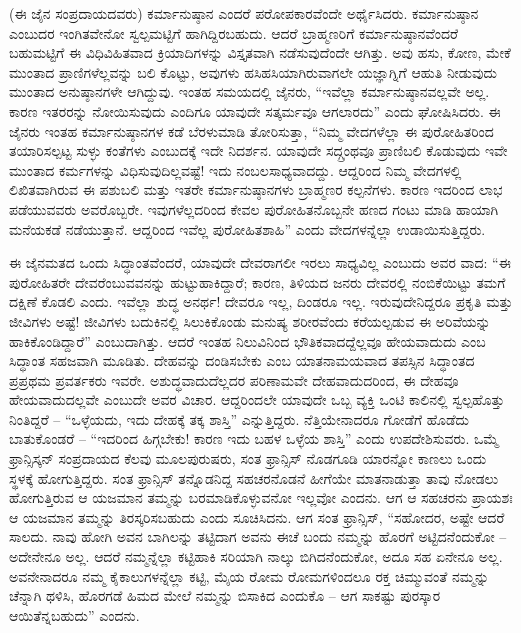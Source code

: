 (ಈ ಜೈನ ಸಂಪ್ರದಾಯದವರು) ಕರ್ಮಾನುಷ್ಠಾನ ಎಂದರೆ ಪರೋಪಕಾರವೆಂದೇ ಅರ್ಥೈಸಿದರು. ಕರ್ಮಾನುಷ್ಠಾನ ಎಂಬುದರ ಇಂಗಿತವೇನೋ ಸ್ವಲ್ಪಮಟ್ಟಿಗೆ ಹಾಗಿದ್ದಿರಬಹುದು. ಆದರೆ ಬ್ರಾಹ್ಮಣರಿಗೆ ಕರ್ಮಾನುಷ್ಠಾನವೆಂದರೆ ಬಹುಮಟ್ಟಿಗೆ ಈ ವಿಧಿವಿಹಿತವಾದ ಕ್ರಿಯಾದಿಗಳನ್ನು ವಿಸ್ತೃತವಾಗಿ ನಡೆಸುವುದೆಂದೇ ಆಗಿತ್ತು. ಅವು ಹಸು, ಕೋಣ, ಮೇಕೆ ಮುಂತಾದ ಪ್ರಾಣಿಗಳೆಲ್ಲವನ್ನು ಬಲಿ ಕೊಟ್ಟು, ಅವುಗಳು ಹಸಿಹಸಿಯಾಗಿರುವಾಗಲೇ ಯಜ್ಞಾಗ್ನಿಗೆ ಆಹುತಿ ನೀಡುವುದು ಮುಂತಾದ ಅನುಷ್ಠಾನಗಳೇ ಆಗಿದ್ದುವು. ಇಂತಹ ಸಮಯದಲ್ಲಿ ಜೈನರು, “ಇವೆಲ್ಲಾ ಕರ್ಮಾನುಷ್ಠಾನವಲ್ಲವೇ ಅಲ್ಲ. ಕಾರಣ ಇತರರನ್ನು ನೋಯಿಸುವುದು ಎಂದಿಗೂ ಯಾವುದೇ ಸತ್ಕರ್ಮವೂ ಆಗಲಾರದು” ಎಂದು ಘೋಷಿಸಿದರು. ಈ ಜೈನರು ಇಂತಹ ಕರ್ಮಾನುಷ್ಠಾನಗಳ ಕಡೆ ಬೆರಳುಮಾಡಿ ತೋರಿಸುತ್ತಾ, “ನಿಮ್ಮ ವೇದಗಳೆಲ್ಲಾ ಈ ಪುರೋಹಿತರಿಂದ ತಯಾರಿಸಲ್ಪಟ್ಟ ಸುಳ್ಳು ಕಂತೆಗಳು ಎಂಬುದಕ್ಕೆ ಇದೇ ನಿದರ್ಶನ. ಯಾವುದೇ ಸದ್ಗ್ರಂಥವೂ ಪ್ರಾಣಿಬಲಿ ಕೊಡುವುದು ಇವೇ ಮುಂತಾದ ಕರ್ಮಗಳನ್ನು ವಿಧಿಸುವುದಿಲ್ಲವಷ್ಟೆ! ಇದು ನಂಬಲಸಾಧ್ಯವಾದದ್ದು. ಆದ್ದರಿಂದ ನಿಮ್ಮ ವೇದಗಳಲ್ಲಿ ಲಿಖಿತವಾಗಿರುವ ಈ ಪಶುಬಲಿ ಮತ್ತು ಇತರೇ ಕರ್ಮಾನುಷ್ಠಾನಗಳು ಬ್ರಾಹ್ಮಣರ ಕಲ್ಪನೆಗಳು. ಕಾರಣ ಇದರಿಂದ ಲಾಭ ಪಡೆಯುವವರು ಅವರೊಬ್ಬರೇ. ಇವುಗಳೆಲ್ಲದರಿಂದ ಕೇವಲ ಪುರೋಹಿತನೊಬ್ಬನೇ ಹಣದ ಗಂಟು ಮಾಡಿ ಹಾಯಾಗಿ ಮನೆಯಕಡೆ ನಡೆಯುತ್ತಾನೆ. ಆದ್ದರಿಂದ ಇವೆಲ್ಲ ಪುರೋಹಿತಶಾಹಿ” ಎಂದು ವೇದಗಳನ್ನೆಲ್ಲಾ ಉಡಾಯಿಸುತ್ತಿದ್ದರು.

ಈ ಜೈನಮತದ ಒಂದು ಸಿದ್ಧಾಂತವೆಂದರೆ, ಯಾವುದೇ ದೇವರಾಗಲೀ ಇರಲು ಸಾಧ್ಯವಿಲ್ಲ ಎಂಬುದು ಅವರ ವಾದ: “ಈ ಪುರೋಹಿತರೇ ದೇವರೆಂಬುವವನನ್ನು ಹುಟ್ಟುಹಾಕಿದ್ದಾರೆ; ಕಾರಣ, ತಿಳಿಯದ ಜನರು ದೇವರಲ್ಲಿ ನಂಬಿಕೆಯಿಟ್ಟು ತಮಗೆ ದಕ್ಷಿಣೆ ಕೊಡಲಿ ಎಂದು. ಇವೆಲ್ಲಾ ಶುದ್ಧ ಅನರ್ಥ! ದೇವರೂ ಇಲ್ಲ, ದಿಂಡರೂ ಇಲ್ಲ. ಇರುವುದೇನಿದ್ದರೂ ಪ್ರಕೃತಿ ಮತ್ತು ಜೀವಿಗಳು ಅಷ್ಟೆ! ಜೀವಿಗಳು ಬದುಕಿನಲ್ಲಿ ಸಿಲುಕಿಕೊಂಡು ಮನುಷ್ಯ ಶರೀರವೆಂದು ಕರೆಯಲ್ಪಡುವ ಈ ಅರಿವೆಯನ್ನು ಹಾಕಿಕೊಂಡಿದ್ದಾರೆ” ಎಂಬುದಾಗಿತ್ತು. ಆದರೆ ಇಂತಹ ನಿಲುವಿನಿಂದ ಭೌತಿಕವಾದದ್ದೆಲ್ಲವೂ ಹೇಯವಾದುದು ಎಂಬ ಸಿದ್ಧಾಂತ ಸಹಜವಾಗಿ ಮೂಡಿತು. ದೇಹವನ್ನು ದಂಡಿಸಬೇಕು ಎಂಬ ಯಾತನಾಮಯವಾದ ತಪಸ್ಸಿನ ಸಿದ್ಧಾಂತದ ಪ್ರಪ್ರಥಮ ಪ್ರವರ್ತಕರು ಇವರೇ. ಅಶುದ್ಧವಾದುದೆಲ್ಲದರ ಪರಿಣಾಮವೇ ದೇಹವಾದುದರಿಂದ, ಈ ದೇಹವೂ ಹೇಯವಾದುದಲ್ಲವೇ ಎಂಬುದೇ ಅವರ ವಿಚಾರ. ಆದ್ದರಿಂದಲೇ ಯಾವುದೇ ಒಬ್ಬ ವ್ಯಕ್ತಿ ಒಂಟಿ ಕಾಲಿನಲ್ಲಿ ಸ್ವಲ್ಪಹೊತ್ತು ನಿಂತಿದ್ದರೆ – “ಒಳ್ಳೆಯದು, ಇದು ದೇಹಕ್ಕೆ ತಕ್ಕ ಶಾಸ್ತಿ” ಎನ್ನುತ್ತಿದ್ದರು. ನೆತ್ತಿಯೇನಾದರೂ ಗೋಡೆಗೆ ಹೊಡೆದು ಬಾತುಕೊಂಡರೆ – “ಇದರಿಂದ ಹಿಗ್ಗಬೇಕು! ಕಾರಣ ಇದು ಬಹಳ ಒಳ್ಳೆಯ ಶಾಸ್ತಿ” ಎಂದು ಉಪದೇಶಿಸುವರು. ಒಮ್ಮೆ ಫ್ರಾನ್ಸಿಸ್ಕನ್ ಸಂಪ್ರದಾಯದ ಕೆಲವು ಮೂಲಪುರುಷರು, ಸಂತ ಫ್ರಾನ್ಸಿಸ್ ನೊಡಗೂಡಿ ಯಾರನ್ನೋ ಕಾಣಲು ಒಂದು ಸ್ಥಳಕ್ಕೆ ಹೋಗುತ್ತಿದ್ದರು. ಸಂತ ಫ್ರಾನ್ಸಿಸ್ ತನ್ನೊಡನಿದ್ದ ಸಹಚರನೊಡನೆ ಹೀಗೆಯೇ ಮಾತನಾಡುತ್ತಾ ತಾವು ನೋಡಲು ಹೋಗುತ್ತಿರುವ ಆ ಯಜಮಾನ ತಮ್ಮನ್ನು ಬರಮಾಡಿಕೊಳ್ಳುವನೋ ಇಲ್ಲವೋ ಎಂದನು. ಆಗ ಆ ಸಹಚರನು ಪ್ರಾಯಶಃ ಆ ಯಜಮಾನ ತಮ್ಮನ್ನು ತಿರಸ್ಕರಿಸಬಹುದು ಎಂದು ಸೂಚಿಸಿದನು. ಆಗ ಸಂತ ಫ್ರಾನ್ಸಿಸ್, “ಸಹೋದರ, ಅಷ್ಟೇ ಆದರೆ ಸಾಲದು. ನಾವು ಹೋಗಿ ಅವನ ಬಾಗಿಲನ್ನು ತಟ್ಟಿದಾಗ ಅವನು ಈಚೆ ಬಂದು ನಮ್ಮನ್ನು ಹೊರಗೆ ಅಟ್ಟಿದನೆಂದುಕೋ – ಅದೇನೇನೂ ಅಲ್ಲ. ಆದರೆ ನಮ್ಮನ್ನೆಲ್ಲಾ ಕಟ್ಟಿಹಾಕಿ ಸರಿಯಾಗಿ ನಾಲ್ಕು ಬಿಗಿದನೆಂದುಕೋ, ಅದೂ ಸಹ ಏನೇನೂ ಅಲ್ಲ. ಅವನೇನಾದರೂ ನಮ್ಮ ಕೈಕಾಲುಗಳನ್ನೆಲ್ಲಾ ಕಟ್ಟಿ, ಮೈಯ ರೋಮ ರೋಮಗಳಿಂದಲೂ ರಕ್ತ ಚಿಮ್ಮುವಂತೆ ನಮ್ಮನ್ನು ಚೆನ್ನಾಗಿ ಥಳಿಸಿ, ಹೊರಗಡೆ ಹಿಮದ ಮೇಲೆ ನಮ್ಮನ್ನು ಬಿಸಾಕಿದ ಎಂದುಕೊ – ಆಗ ಸಾಕಷ್ಟು ಪುರಸ್ಕಾರ ಆಯಿತೆನ್ನಬಹುದು” ಎಂದನು.

